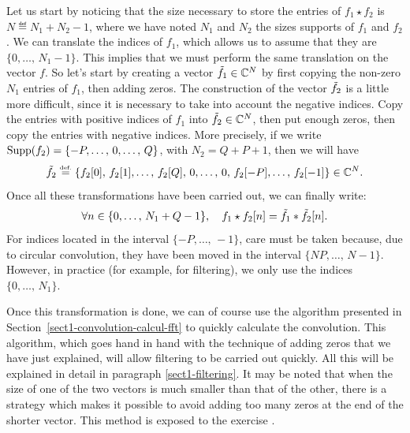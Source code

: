  
 Let us start by noticing that the size necessary to store the entries of $ f_1 \star f_2 $ is $ N \eqdef N_1 + N_2 - 1 $, where we have noted $ N_1 $ and $ N_2 $ the sizes supports of $ f_1 $ and $ f_2 $. We can translate the indices of $ f_1 $, which allows us to assume that they are $ \{0, \ldots, \, N_1-1\} $. This implies that we must perform the same translation on the vector $ f $. So let's start by creating a vector $ \tilde{f_1} \in \mathbb{C}^{N} $ by first copying the non-zero $ N_1 $ entries of $ f_1 $, then adding zeros. The construction of the vector $ \tilde{f_2} $ is a little more difficult, since it is necessary to take into account the negative indices. Copy the entries with positive indices of $ f_1 $ into $ \tilde{f_2} \in \mathbb{C}^{N} $, then put enough zeros, then copy the entries with negative indices. More precisely, if we write $ \operatorname{Supp} (f_2) = \{- P, \ldots, \, 0, \ldots, \, Q\} $, with $ N_2 = Q + P + 1 $, then we will have
\begin{equation*}
\tilde{f_2} \stackrel{\mbox{\upshape\tiny def.}}{=} \{f_2 [0], \, f_2 [1], \ldots, \, f_2 [Q], \, 0, \ldots, \, 0, \, f_2 [-P], \ldots, \, f_2 [-1]\} \in \mathbb{C}^N.
\end{equation*}
Once all these transformations have been carried out, we can finally write:
\begin{equation*}
\forall n \in \{0, \ldots, \, N_1 + Q-1\}, \quad f_1 \star f_2 [n] = \tilde{f_1} * \tilde{f_2}[n].
\end{equation*}
For indices located in the interval $ \{- P, \ldots, \, -1\} $, care must be taken because, due to circular convolution, they have been moved in the interval $ \{NP , \ldots, \, N-1\} $. However, in practice (for example, for filtering), we only use the indices $ \{0, \ldots, \, N_1\} $.
 
 
Once this transformation is done, we can of course use the algorithm presented in Section~\ref{sect1-convolution-calcul-fft} to quickly calculate the convolution. This algorithm, which goes hand in hand with the technique of adding zeros that we have just explained, will allow filtering to be carried out quickly. All this will be explained in detail in paragraph \ref{sect1-filtering}. It may be noted that when the size of one of the two vectors is much smaller than that of the other, there is a strategy which makes it possible to avoid adding too many zeros at the end of the shorter vector. This method is exposed to the exercise .
 
